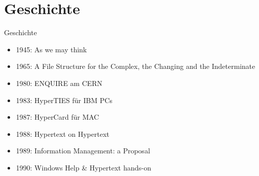 \section{Geschichte}
\begin{frame}{Geschichte}
\begin{itemize}
	\item 1945: As we may think
	\item 1965: A File Structure for the Complex, the Changing and the Indeterminate
	\item 1980: ENQUIRE am CERN
	\item 1983: HyperTIES für IBM PCs
	\item 1987: HyperCard für MAC
	\item 1988: Hypertext on Hypertext
	\item 1989: Information Management: a Proposal
	\item 1990: Windows Help \& Hypertext hands-on
\end{itemize}
\end{frame}
